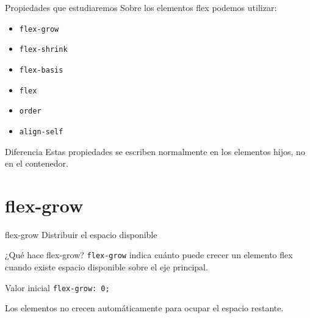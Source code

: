 \documentclass[aspectratio=169,11.5pt]{beamer}
\begin{document}
    \begin{frame}{Propiedades que estudiaremos}
        Sobre los elementos flex podemos utilizar:

        \begin{itemize}
            \item \texttt{flex-grow}
            \item \texttt{flex-shrink}
            \item \texttt{flex-basis}
            \item \texttt{flex}
            \item \texttt{order}
            \item \texttt{align-self}
        \end{itemize}

        \begin{block}{Diferencia}
            Estas propiedades se escriben normalmente
            en los elementos hijos, no en el contenedor.
        \end{block}
    \end{frame}



    \section{flex-grow}

    \SectionSlide
    {flex-grow}
    {Distribuir el espacio disponible}

    \begin{frame}{¿Qué hace flex-grow?}
        \texttt{flex-grow} indica cuánto puede crecer
        un elemento flex cuando existe espacio disponible
        sobre el eje principal.

        \begin{block}{Valor inicial}
            \texttt{flex-grow: 0;}

            Los elementos no crecen automáticamente
            para ocupar el espacio restante.
        \end{block}
    \end{frame}
\end{document}
